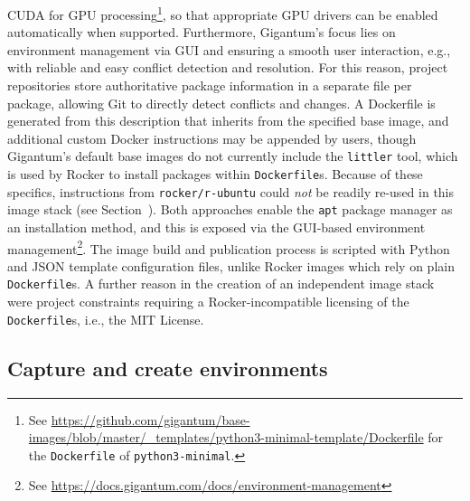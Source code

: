 \begin{itemize}
  CUDA for GPU
  processing\footnote{See \href{https://github.com/gigantum/base-images/blob/master/_templates/python3-minimal-template/Dockerfile}{https://github.com/gigantum/base-images/blob/master/\_templates/python3-minimal-template/Dockerfile} for the \texttt{Dockerfile} of \texttt{python3-minimal}.},
  so that appropriate GPU drivers can be enabled automatically when
  supported. Furthermore, Gigantum's focus lies on environment
  management via GUI and ensuring a smooth user interaction, e.g., with
  reliable and easy conflict detection and resolution. For this reason,
  project repositories store authoritative package information in a
  separate file per package, allowing Git to directly detect conflicts
  and changes. A Dockerfile is generated from this description that
  inherits from the specified base image, and additional custom Docker
  instructions may be appended by users, though Gigantum's default base
  images do not currently include the \texttt{littler} tool, which is
  used by Rocker to install packages within \texttt{Dockerfile}s.
  Because of these specifics, instructions from \texttt{rocker/r-ubuntu}
  could \emph{not} be readily re-used in this image stack (see
  Section~). Both approaches enable the
  \texttt{apt} package manager \citep{wikipedia_contributors_apt_2020}
  as an installation method, and this is exposed via the GUI-based
  environment
  management\footnote{See \href{https://docs.gigantum.com/docs/environment-management}{https://docs.gigantum.com/docs/environment-management}}.
  The image build and publication process is scripted with Python and
  JSON template configuration files, unlike Rocker images which rely on
  plain \texttt{Dockerfile}s. A further reason in the creation of an
  independent image stack were project constraints requiring a
  Rocker-incompatible licensing of the \texttt{Dockerfile}s, i.e., the
  MIT License.
\end{itemize}

\hypertarget{capture-and-create-environments}{%
\subsection{Capture and create
environments}\label{capture-and-create-environments}}

\label{envs}

